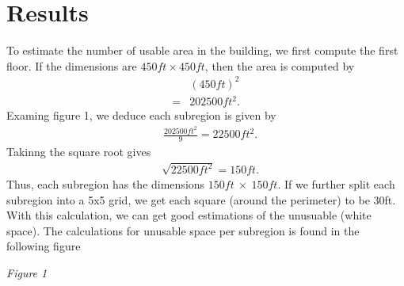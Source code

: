 \documentclass{report}
\begin{document}
    \bigbreak \noindent 
    \section{Results}
    \bigbreak \noindent 
    To estimate the number of usable area in the building, we first compute the first floor. If the dimensions are $450ft \times 450ft $, then the area is computed by
    \begin{align*}
        &(450ft)^{2} \\
        =&202500ft^{2}
    .\end{align*}
    \bigbreak \noindent 
    Examing figure 1, we deduce each subregion is given by
    \begin{align*}
        &\frac{202500ft^{2}}{9} =22500ft^{2}
    .\end{align*}
    Takinng the square root gives
    \begin{align*}
        &\sqrt{22500ft^{2}} =150ft
    .\end{align*}
    Thus, each subregion has the dimensions $150ft\ \times\ 150ft$. If we further split each subregion into a 5x5 grid, we get each square (around the perimeter) to be 30ft. With this calculation, we can get good estimations of the unusuable (white space). The calculations for unusable space per subregion is found in the following figure
    \pagebreak \bigbreak \noindent 
    \begin{figure}[ht]
        \centering
        \label{fig:figure1}
    \end{figure}
    \begin{center}
        \textit{Figure 1}
    \end{center}
\end{document}
